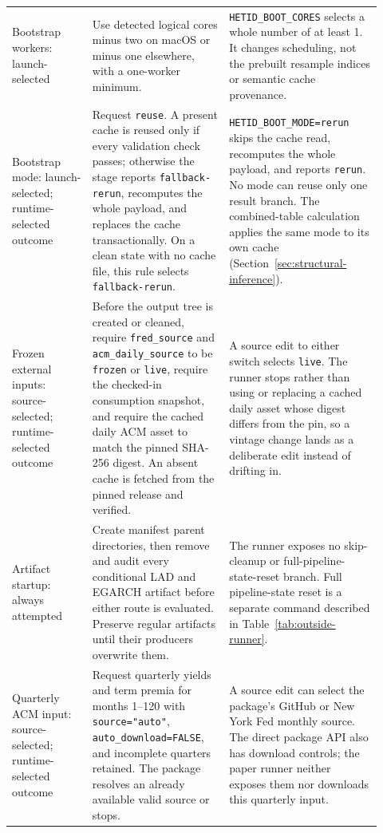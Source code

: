 \documentclass[11pt]{article}
\DeclareRobustCommand{\code}[1]{%
  \ifmmode\text{\ttfamily\detokenize{#1}}\else\nolinkurl{#1}\fi}
\begin{document}
\begin{landscape}
\begin{longtable}{@{}>{\raggedright\arraybackslash}p{0.20\linewidth}
  >{\raggedright\arraybackslash}p{0.34\linewidth}
  >{\raggedright\arraybackslash}p{0.38\linewidth}@{}}
Bootstrap workers: launch-selected &
Use detected logical cores minus two on macOS or minus one elsewhere, with a
one-worker minimum. &
\code{HETID_BOOT_CORES} selects a whole number of at least 1. It changes
scheduling, not the prebuilt resample indices or semantic cache provenance.\\
Bootstrap mode: launch-selected; runtime-selected outcome &
Request \code{reuse}. A present cache is reused only if every validation check
passes; otherwise the stage reports \code{fallback-rerun}, recomputes the whole
payload, and replaces the cache transactionally. On a clean state with no cache
file, this rule selects \code{fallback-rerun}. &
\code{HETID_BOOT_MODE=rerun} skips the cache read, recomputes the whole payload,
and reports \code{rerun}. No mode can reuse only one result branch. The
combined-table calculation applies the same mode to its own cache
(Section~\ref{sec:structural-inference}).\\
Frozen external inputs: source-selected; runtime-selected outcome &
Before the output tree is created or cleaned, require \code{fred_source} and
\code{acm_daily_source} to be \code{frozen} or \code{live}, require the checked-in
consumption snapshot, and require the cached daily ACM asset to match the pinned
SHA-256 digest. An absent cache is fetched from the pinned release and verified. &
A source edit to either switch selects \code{live}. The runner stops rather than
using or replacing a cached daily asset whose digest differs from the pin, so a
vintage change lands as a deliberate edit instead of drifting in.\\
Artifact startup: always attempted &
Create manifest parent directories, then remove and audit every conditional LAD
and EGARCH artifact before either route is evaluated. Preserve regular artifacts
until their producers overwrite them. &
The runner exposes no skip-cleanup or full-pipeline-state-reset branch. Full
pipeline-state reset is a separate command described in
Table~\ref{tab:outside-runner}.\\
Quarterly ACM input: source-selected; runtime-selected outcome &
Request quarterly yields and term premia for months 1--120 with
\code{source="auto"}, \code{auto_download=FALSE}, and incomplete quarters retained.
The package resolves an already available valid source or stops. &
A source edit can select the package's GitHub or New York Fed monthly source.
The direct package API also has download controls; the paper runner neither
exposes them nor downloads this quarterly input.\\

\end{longtable}
\end{landscape}
\end{document}
